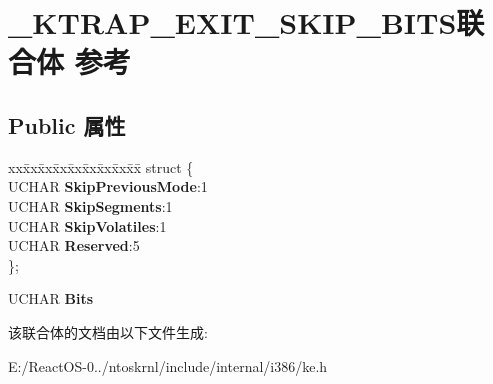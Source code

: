 \hypertarget{union___k_t_r_a_p___e_x_i_t___s_k_i_p___b_i_t_s}{}\section{\+\_\+\+K\+T\+R\+A\+P\+\_\+\+E\+X\+I\+T\+\_\+\+S\+K\+I\+P\+\_\+\+B\+I\+T\+S联合体 参考}
\label{union___k_t_r_a_p___e_x_i_t___s_k_i_p___b_i_t_s}
\subsection*{Public 属性}
\begin{DoxyCompactItemize}
\item 
\mbox{\label{union___k_t_r_a_p___e_x_i_t___s_k_i_p___b_i_t_s_af44430367fc7dcb9f9b942f4dece1782}} 
\begin{tabbing}
xx\=xx\=xx\=xx\=xx\=xx\=xx\=xx\=xx\=\kill
struct \{\\
\>UCHAR {\bfseries SkipPreviousMode}:1\\
\>UCHAR {\bfseries SkipSegments}:1\\
\>UCHAR {\bfseries SkipVolatiles}:1\\
\>UCHAR {\bfseries Reserved}:5\\
\}; \\

\end{tabbing}\item 
\mbox{\label{union___k_t_r_a_p___e_x_i_t___s_k_i_p___b_i_t_s_a6b6a311ae64222edb151aa2124b4855e}} 
U\+C\+H\+AR {\bfseries Bits}
\end{DoxyCompactItemize}


该联合体的文档由以下文件生成\+:\begin{DoxyCompactItemize}
\item 
E\+:/\+React\+O\+S-\/0../ntoskrnl/include/internal/i386/ke.\+h\end{DoxyCompactItemize}
